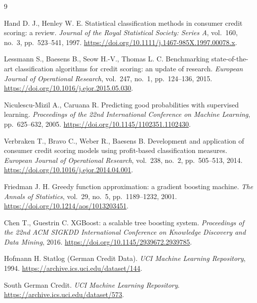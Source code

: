 \documentclass{misisarticle}
\begin{document}
\begin{thebibliography}{9}

Hand D. J., Henley W. E. Statistical classification methods in consumer credit scoring: a review. \textit{Journal of the Royal Statistical Society: Series A}, vol.~160, no.~3, pp.~523--541, 1997.
\url{https://doi.org/10.1111/j.1467-985X.1997.00078.x}.

Lessmann S., Baesens B., Seow H.-V., Thomas L. C. Benchmarking state-of-the-art classification algorithms for credit scoring: an update of research. \textit{European Journal of Operational Research}, vol.~247, no.~1, pp.~124--136, 2015.
\url{https://doi.org/10.1016/j.ejor.2015.05.030}.

Niculescu-Mizil A., Caruana R. Predicting good probabilities with supervised learning. \textit{Proceedings of the 22nd International Conference on Machine Learning}, pp.~625--632, 2005.
\url{https://doi.org/10.1145/1102351.1102430}.

Verbraken T., Bravo C., Weber R., Baesens B. Development and application of consumer credit scoring models using profit-based classification measures. \textit{European Journal of Operational Research}, vol.~238, no.~2, pp.~505--513, 2014.
\url{https://doi.org/10.1016/j.ejor.2014.04.001}.

Friedman J. H. Greedy function approximation: a gradient boosting machine. \textit{The Annals of Statistics}, vol.~29, no.~5, pp.~1189--1232, 2001.
\url{https://doi.org/10.1214/aos/1013203451}.

Chen T., Guestrin C. XGBoost: a scalable tree boosting system. \textit{Proceedings of the 22nd ACM SIGKDD International Conference on Knowledge Discovery and Data Mining}, 2016.
\url{https://doi.org/10.1145/2939672.2939785}.

Hofmann H. Statlog (German Credit Data). \textit{UCI Machine Learning Repository}, 1994.
\url{https://archive.ics.uci.edu/dataset/144}.

South German Credit. \textit{UCI Machine Learning Repository}.
\url{https://archive.ics.uci.edu/dataset/573}.

\end{thebibliography}
\end{document}
